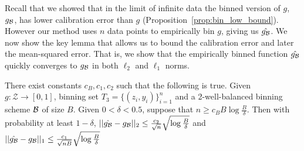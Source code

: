 Recall that we showed that in the limit of infinite data the binned version of $g$, $g_{\mathcal{B}{}}$, has lower calibration error than $g$ (Proposition~\ref{prop:bin_low_bound}). However our method uses $n$ data points to empirically bin $g$, giving us $\hat{g_{\mathcal{B}{}}}$. We now show the key lemma that allows us to bound the calibration error and later the mean-squared error. That is, we show that the empirically binned function $\hat{g_{\mathcal{B}{}}}$ quickly converges to $g_{\mathcal{B}{}}$ in both $\ell_2$ and $\ell_1$ norms.

\begin{lemma}
\label{thm:empirical-binning}
There exist constants $c_B, c_1, c_2$ such that the following is true. Given $g : \mathcal{Z} \to [0, 1]$, binning set $T_3 = \{(z_i, y_i)\}_{i=1}^n$ and a 2-well-balanced binning scheme $\mathcal{B}{}$ of size $B$. Given $0 < \delta < 0.5$, suppose that $n \geq c_B B\log{\frac{B}{\delta}}$. Then with probability at least $1 - \delta$,  $||\hat{g_{\mathcal{B}{}}} - g_{\mathcal{B}{}}||_2 \leq \frac{c_2}{\sqrt{n}}\sqrt{\log{\frac{B}{\delta}}}$ and $||\hat{g_{\mathcal{B}{}}} - g_{\mathcal{B}{}}||_1 \leq \frac{c_1}{\sqrt{nB}}\sqrt{\log{\frac{B}{\delta}}}$
\end{lemma}


